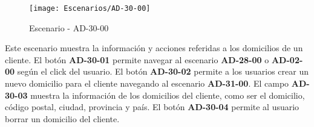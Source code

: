 \begin{figure}[H]
\centering
\texttt{[image: Escenarios/AD-30-00]}
\caption{Escenario - AD-30-00}
\label{fig:AD-30-00}
\end{figure}
Este escenario muestra la información y acciones referidas a los domicilios de un cliente. 
El botón \textbf{AD-30-01} permite navegar al escenario \textbf{AD-28-00} o \textbf{AD-02-00} según el click del usuario.
El botón \textbf{AD-30-02} permite a los usuarios crear un nuevo domicilio para el cliente navegando al escenario \textbf{AD-31-00}.
El campo \textbf{AD-30-03} muestra la información de los domicilios del cliente, como ser el domicilio, código postal, ciudad, provincia y país. El botón \textbf{AD-30-04} permite al usuario borrar un domicilio del cliente.
\clearpage
